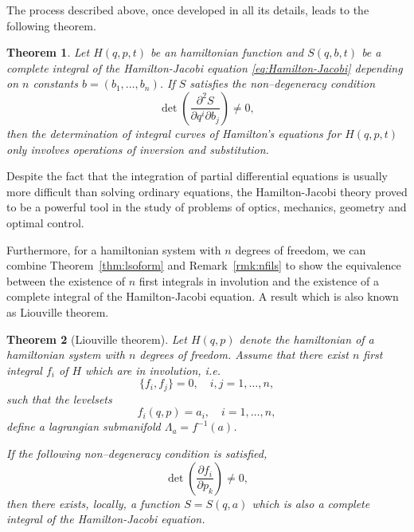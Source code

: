 \documentclass[english,fontsize=11pt,paper=a5,oneside]{scrbook}
\newtheorem{theorem}{Theorem}[chapter]
\theoremstyle{definition}
\begin{document}
The process described above, once developed in all its details, leads to the following theorem.

\begin{theorem}
  Let $H(q,p,t)$ be an hamiltonian function and $S(q,b,t)$ be a complete integral of the Hamilton-Jacobi equation \eqref{eq:Hamilton-Jacobi} depending on $n$ constants $b=(b_1,\ldots,b_n)$. If $S$ satisfies the non--degeneracy condition
  \begin{equation}
    \det\left(\frac{\partial^2 S}{\partial q^i \partial b_j}\right) \neq 0,
  \end{equation}
  then the determination of integral curves of Hamilton's equations for $H(q,p,t)$ only involves operations of inversion and substitution.
\end{theorem}

Despite the fact that the integration of partial differential equations is usually more difficult than solving ordinary equations, the Hamilton-Jacobi theory proved to be a powerful tool in the study of problems of optics, mechanics, geometry and optimal control.

Furthermore, for a hamiltonian system with $n$ degrees of freedom, we can combine Theorem~\ref{thm:lsoform} and Remark~\ref{rmk:nfils} to show the equivalence between the existence of $n$ first integrals in involution and the existence of a complete integral of the Hamilton-Jacobi equation.
A result which is also known as Liouville theorem.

\begin{theorem}[Liouville theorem]
  Let $H(q,p)$ denote the hamiltonian of a hamiltonian system with $n$ degrees of freedom.
  Assume that there exist $n$ first integral $f_i$ of $H$ which are in involution, i.e.
  \begin{equation}
    \big\{ f_i, f_j\big\} = 0, \quad i,j = 1,\ldots, n,
  \end{equation}
  such that the levelsets
  \begin{equation}
    f_i(q,p) = a_i, \quad i=1,\ldots,n,
  \end{equation}
  define a lagrangian submanifold $\Lambda_a = f^{-1}(a)$.

  If the following non--degeneracy condition is satisfied,
  \begin{equation}
    \det\left(\frac{\partial f_i}{\partial p_k}\right)\neq 0,
  \end{equation}
  then there exists, locally, a function $S=S(q,a)$ which is also a complete integral of the Hamilton-Jacobi equation.
\end{theorem}
\end{document}
